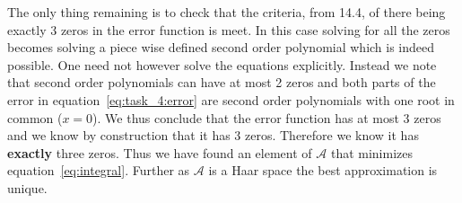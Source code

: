 \begin{solution}
The only thing remaining is to check that the criteria, from 14.4, of
there being exactly 3 zeros in the error function is meet. In this
case solving for all the zeros becomes solving a piece wise defined
second order polynomial which is indeed possible. One need not however
solve the equations explicitly. Instead we note that second order
polynomials can have at most 2 zeros and both parts of the error in
equation~\ref{eq:task_4:error} are second order polynomials with one
root in common ($x = 0$). We thus conclude that the error function has
at most 3 zeros and we know by construction that it has 3
zeros. Therefore we know it has {\bf exactly } three zeros. Thus we
have found an element of $\mathcal{A}$ that minimizes
equation~\ref{eq:integral}. Further as $\mathcal{A}$ is a Haar space
the best approximation is unique.

    

\end{solution}


